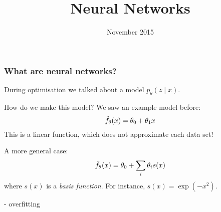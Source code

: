 \documentclass[USenglish,pdftex,compress,10pt,svgnamesi,handout]{beamer}
\title{Neural Networks}
\date{November 2015}
\begin{document}
\begin{frame}
	\titlepage
\end{frame}

\begin{frame}
\frametitle{What are neural networks?}
During optimisation we talked about a model $p_\theta(z\mid x)$.

How do we make this model?  We saw an example model before:
$$
\hat{f}_\theta(x) = \theta_0 + \theta_1 x
$$
This is a linear function, which does not approximate each data set!

A more general case:
$$
\hat{f}_\theta(x) = \theta_0 + \sum_i \theta_i s(x)
$$
where $s(x)$ is a \textsl{basis function}.  For instance, $s(x) = \exp(-x^2)$.

\end{frame}


- overfitting
\end{document}
